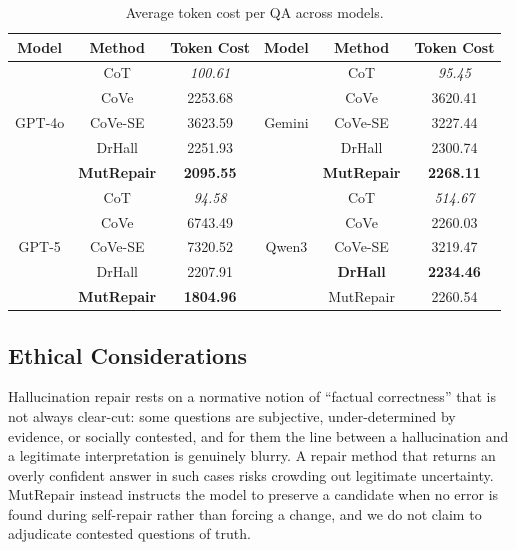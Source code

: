 \documentclass[acmsmall,screen,review,anonymous]{acmart}
\begin{document}
\begin{table}[t]
  \centering
  \footnotesize
  \setlength{\tabcolsep}{6pt}
  \caption{Average token cost per QA across models.}
  \label{tab:cost}
  \begin{tabular}{c|cc|c|cc}
    \toprule
    Model & Method & Token Cost &
    Model & Method & Token Cost \\
    \midrule
    \multirow{5}{*}{GPT-4o}
      & CoT     & \textit{100.61}
      & \multirow{5}{*}{Gemini}
      & CoT     & \textit{95.45} \\
      & CoVe    & 2253.68
      & & CoVe    & 3620.41 \\
      & CoVe-SE & 3623.59
      & & CoVe-SE & 3227.44 \\
      & DrHall  & 2251.93
      & & DrHall  & 2300.74 \\
      & \textbf{MutRepair} & \textbf{2095.55}
      & & \textbf{MutRepair} & \textbf{2268.11} \\
    \midrule
    \multirow{5}{*}{GPT-5}
      & CoT     & \textit{94.58}
      & \multirow{5}{*}{Qwen3}
      & CoT     & \textit{514.67} \\
      & CoVe    & 6743.49
      & & CoVe    & 2260.03 \\
      & CoVe-SE & 7320.52
      & & CoVe-SE & 3219.47 \\
      & DrHall  & 2207.91
      & & \textbf{DrHall} & \textbf{2234.46} \\
      & \textbf{MutRepair} & \textbf{1804.96}
      & & MutRepair & 2260.54 \\
    \bottomrule
  \end{tabular}
\end{table}

\subsection{Ethical Considerations}
Hallucination repair rests on a normative notion of ``factual correctness'' that is not always clear-cut: some questions are subjective, under-determined by evidence, or socially contested, and for them the line between a hallucination and a legitimate interpretation is genuinely blurry. A repair method that returns an overly confident answer in such cases risks crowding out legitimate uncertainty. MutRepair instead instructs the model to preserve a candidate when no error is found during self-repair rather than forcing a change, and we do not claim to adjudicate contested questions of truth.
\end{document}
